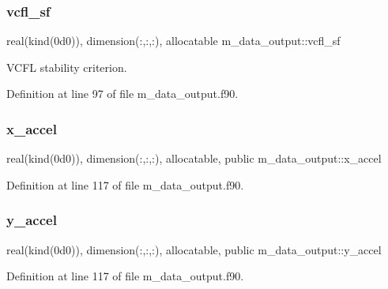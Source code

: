 \mbox{\label{namespacem__data__output_a629c072bc28e09fe890b966f8adb5f55}} 
\subsubsection{\texorpdfstring{vcfl\+\_\+sf}{vcfl\_sf}}
{\footnotesize\ttfamily real(kind(0d0)), dimension(\+:,\+:,\+:), allocatable m\+\_\+data\+\_\+output\+::vcfl\+\_\+sf}



V\+C\+FL stability criterion. 



Definition at line 97 of file m\+\_\+data\+\_\+output.\+f90.

\mbox{\label{namespacem__data__output_ac465283e56b508af6500bea1ad4c745c}} 
\subsubsection{\texorpdfstring{x\+\_\+accel}{x\_accel}}
{\footnotesize\ttfamily real(kind(0d0)), dimension(\+:,\+:,\+:), allocatable, public m\+\_\+data\+\_\+output\+::x\+\_\+accel}



Definition at line 117 of file m\+\_\+data\+\_\+output.\+f90.

\mbox{\label{namespacem__data__output_a9170ca95f1f4493fd30a48052ed214a7}} 
\subsubsection{\texorpdfstring{y\+\_\+accel}{y\_accel}}
{\footnotesize\ttfamily real(kind(0d0)), dimension(\+:,\+:,\+:), allocatable, public m\+\_\+data\+\_\+output\+::y\+\_\+accel}



Definition at line 117 of file m\+\_\+data\+\_\+output.\+f90.

